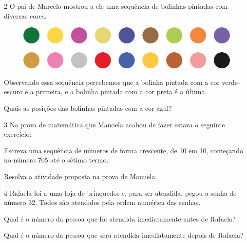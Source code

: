 \num{2} O pai de Marcelo mostrou a ele uma sequência de bolinhas pintadas com
diversas cores.

\begin{figure}[htpb!]
\includegraphics[width=\textwidth]{./media/image28.png}
\end{figure}

Observando essa sequência percebemos que a bolinha pintada com a cor
verde-escuro é a primeira, e a bolinha pintada com a cor preta é a
última.

Quais as posições das bolinhas pintadas com a cor azul?


\num{3} Na prova de matemática que Manoela acabou de fazer estava o seguinte exercício:

\begin{myquote}
Escreva uma sequência de números de forma crescente, de 10 em 10, começando no número 705 até o sétimo termo.


\end{myquote}

Resolva a atividade proposta na prova de Manuela.


\num{4} Rafaela foi a uma loja de brinquedos e, para ser atendida, pegou a senha de
número 32. Todos são atendidos pela ordem numérica das senhas.



\begin{escolha}
\item Qual é o número da pessoa que foi atendida imediatamente antes de Rafaela?

\item Qual é o número da pessoa que será atendida imediatamente depois de Rafaela?
\end{escolha}

